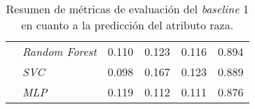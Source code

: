 \begin{table}[htpb]
{\begin{tabular}{llcccc}
                                            & \emph{Random Forest}        & 0.110 & 0.123 & 0.116 & 0.894\\
        \cmidrule{2-6}
                                            & \emph{SVC}                  & 0.098 & 0.167 & 0.123 & 0.889\\
        \cmidrule{2-6}
                                            & \emph{MLP}                  & 0.119 & 0.112 & 0.111 & 0.876\\
        \bottomrule
        \end{tabular}}
    \caption{Resumen de m\'etricas de evaluaci\'on del \emph{baseline} 1 en cuanto a la predicci\'on del atributo raza.}
    \label{table:eval_baseline1_race}
\end{table}

\begin{table}[htpb]
    \centering
    \caption{Resumen de m\'etricas de evaluaci\'on del \emph{baseline} 2 en cuanto a la predicci\'on del atributo g\'enero.}
    \label{table:eval_baseline2_gender}
\end{table}

\begin{table}[htpb]
    \centering
    \caption{Resumen de m\'etricas de evaluaci\'on del \emph{baseline} 2 en cuanto a la predicci\'on del atributo raza.}
    \label{table:eval_baseline2_race}
\end{table}


